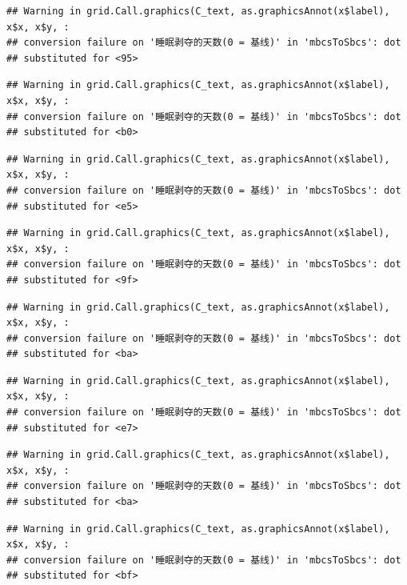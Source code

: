 \documentclass[
]{book}
\begin{document}
\begin{verbatim}
## Warning in grid.Call.graphics(C_text, as.graphicsAnnot(x$label), x$x, x$y, :
## conversion failure on '睡眠剥夺的天数(0 = 基线)' in 'mbcsToSbcs': dot
## substituted for <95>
\end{verbatim}

\begin{verbatim}
## Warning in grid.Call.graphics(C_text, as.graphicsAnnot(x$label), x$x, x$y, :
## conversion failure on '睡眠剥夺的天数(0 = 基线)' in 'mbcsToSbcs': dot
## substituted for <b0>
\end{verbatim}

\begin{verbatim}
## Warning in grid.Call.graphics(C_text, as.graphicsAnnot(x$label), x$x, x$y, :
## conversion failure on '睡眠剥夺的天数(0 = 基线)' in 'mbcsToSbcs': dot
## substituted for <e5>
\end{verbatim}

\begin{verbatim}
## Warning in grid.Call.graphics(C_text, as.graphicsAnnot(x$label), x$x, x$y, :
## conversion failure on '睡眠剥夺的天数(0 = 基线)' in 'mbcsToSbcs': dot
## substituted for <9f>
\end{verbatim}

\begin{verbatim}
## Warning in grid.Call.graphics(C_text, as.graphicsAnnot(x$label), x$x, x$y, :
## conversion failure on '睡眠剥夺的天数(0 = 基线)' in 'mbcsToSbcs': dot
## substituted for <ba>
\end{verbatim}

\begin{verbatim}
## Warning in grid.Call.graphics(C_text, as.graphicsAnnot(x$label), x$x, x$y, :
## conversion failure on '睡眠剥夺的天数(0 = 基线)' in 'mbcsToSbcs': dot
## substituted for <e7>
\end{verbatim}

\begin{verbatim}
## Warning in grid.Call.graphics(C_text, as.graphicsAnnot(x$label), x$x, x$y, :
## conversion failure on '睡眠剥夺的天数(0 = 基线)' in 'mbcsToSbcs': dot
## substituted for <ba>
\end{verbatim}

\begin{verbatim}
## Warning in grid.Call.graphics(C_text, as.graphicsAnnot(x$label), x$x, x$y, :
## conversion failure on '睡眠剥夺的天数(0 = 基线)' in 'mbcsToSbcs': dot
## substituted for <bf>
\end{verbatim}
\end{document}
